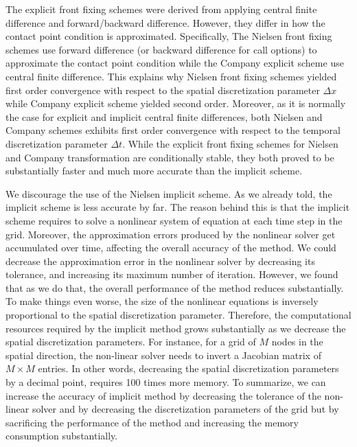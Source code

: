 The explicit front fixing schemes were derived from applying central finite difference and forward/backward difference. However, they differ in how the contact point condition is approximated. Specifically, The Nielsen front fixing schemes use forward difference (or backward difference for call options) to approximate the contact point condition while the Company explicit scheme use central finite difference. This explains why Nielsen front fixing schemes yielded first order convergence with respect to the spatial discretization parameter $\Delta{x}$ while Company explicit scheme yielded second order. Moreover, as it is normally the case for explicit and implicit central finite differences, both Nielsen and Company schemes exhibits first order convergence with respect to the temporal discretization parameter $\Delta{t}$. While the explicit front fixing schemes for Nielsen and Company transformation are conditionally stable, they both proved to be substantially faster and much more accurate than the implicit scheme. 

We discourage the use of the Nielsen implicit scheme. As we already told, the implicit scheme is less accurate by far. The reason behind this is that the implicit scheme requires to solve a nonlinear system of equation at each time step in the grid. Moreover, the approximation errors produced by the nonlinear solver get accumulated over time, affecting the overall accuracy of the method. We could decrease the approximation error in the nonlinear solver by decreasing its tolerance, and increasing its maximum number of iteration. However, we found that as we do that, the overall performance of the method reduces substantially. To make things even worse, the size of the nonlinear equations is inversely proportional to the spatial discretization parameter. Therefore, the computational resources required by the implicit method grows substantially as we decrease the spatial discretization parameters. For instance, for a grid of $M$ nodes in the spatial direction, the non-linear solver needs to invert a Jacobian matrix of $M\times M$ entries. In other words, decreasing the spatial discretization parameters by a decimal point, requires 100 times more memory. To summarize, we can increase the accuracy of implicit method by decreasing the tolerance of the non-linear solver and by decreasing the discretization parameters of the grid but by sacrificing the performance of the method and increasing the memory consumption substantially.

